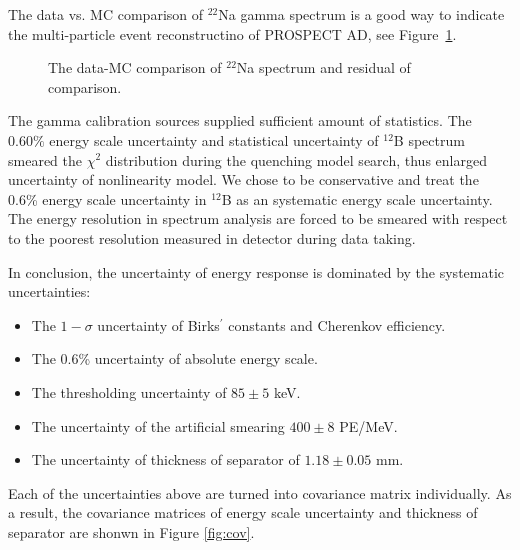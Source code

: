The data vs. MC comparison of $^{22}$Na gamma spectrum is a good way to indicate the multi-particle event reconstructino of PROSPECT AD, see Figure~\ref{fig:Na22final}.

\begin{figure}[h!]
\centering
{} \quad
{} \quad
\caption{The data-MC comparison of $^{22}$Na spectrum and residual of comparison.}
\label{fig:Na22final}
\end{figure}

\newpage
The gamma calibration sources supplied sufficient amount of statistics. 
The $0.60\%$ energy scale uncertainty and statistical uncertainty of $^{12}$B spectrum smeared the $\chi^2$ distribution during the quenching model search, thus enlarged uncertainty of nonlinearity model. 
We chose to be conservative and treat the 0.6\% energy scale uncertainty in $^{12}$B as an systematic energy scale uncertainty.
The energy resolution in spectrum analysis are forced to be smeared with respect to the poorest resolution measured in detector during data taking.

In conclusion, the uncertainty of energy response is dominated by the systematic uncertainties:

\begin{itemize}
    \item The $1-\sigma$ uncertainty of Birks$^\prime$ constants and Cherenkov efficiency.
    \item The 0.6\% uncertainty of absolute energy scale.
    \item The thresholding uncertainty of $85\pm5$ keV.
    \item The uncertainty of the artificial smearing $400\pm8$ PE/MeV.
    \item The uncertainty of thickness of separator of $1.18\pm0.05$ mm.
\end{itemize}
Each of the uncertainties above are turned into covariance matrix individually. 
As a result, the covariance matrices of energy scale uncertainty and thickness of separator are shonwn in Figure \ref{fig:cov}.


